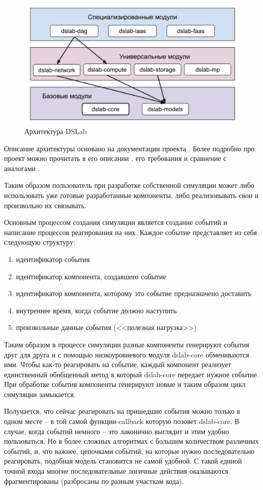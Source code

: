 \begin{figure}[H]
    \centering
    \includegraphics[width=0.7\linewidth]{images/dslab_arc.png}
    \caption{Архитектура DSLab}
    \label{dslab_arc}
\end{figure}

Описание архитектуры основано на документации проекта \cite{dslab-architecture}. Более подробно про проект можно прочитать в его описании \cite{dslab-description}, его требования \cite{dslab-requirements} и сравнение с аналогами \cite{dslab-analog-cmp}.

Таким образом пользователь при разработке собственной симуляции может либо использовать уже готовые разработанные компоненты, либо реализовывать свои и произвольно их связывать. 


Основным процессом создания симуляции является создание событий и написание процессов реагирования на них. Каждое событие представляет из себя следующую структуру: 
\begin{enumerate}
    \item идентификатор события 
    \item идентификатор компонента, создавшего событие 
    \item идентификатор компонента, которому это событие предназначено доставить 
    \item внутреннее время, когда событие должно наступить
    \item произвольные данные события (<<полезная нагрузка>>)
\end{enumerate}

Таким образом в процессе симуляции разные компоненты генерируют события друг для друга и с помощью низкоуровневого модуля dslab-core обмениваются ими. Чтобы как-то реагировать на событие, каждый компонент реализует единственный обобщенный метод в который dslab-core передает нужное событие. При обработке события компоненты генерируют новые и таким образом цикл симуляции замыкается. 

Получается, что сейчас реагировать на пришедшие события можно только в одном месте -- в той самой функции-callback которую позовет dslab-core. В случае, когда событий немного -- это лаконично выглядит и этим удобно пользоваться. Но в более сложных алгоритмах с большим количеством различных событий, и, что важнее, цепочками событий, на которые нужно последовательно реагировать, подобная модель становится не самой удобной. С такой единой точной входа многие последовательные логичные действия оказываются фрагментированы (разбросаны по разным участкам кода). 

